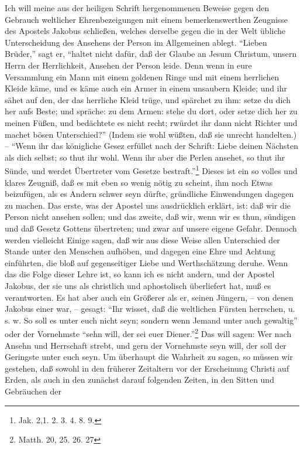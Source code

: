 Ich will meine aus der heiligen Schrift hergenommenen Beweise gegen den Gebrauch
weltlicher Ehrenbezeigungen mit einem bemerkenswerthen Zeugnisse des Apostels
Jakobus schließen, welches derselbe gegen die in der Welt übliche Unterscheidung
des Ansehens der Person im Allgemeinen ablegt. "`Lieben Brüder,"' sagt er,
"`haltet nicht dafür, daß der Glaube an Jesum Christum, unsern Herrn der
Herrlichkeit, Ansehen der Person leide. Denn wenn in eure Versammlung ein Mann
mit einem goldenen Ringe und mit einem herrlichen Kleide käme, und es käme auch
ein Armer in einem unsaubern Kleide; und ihr sähet auf den, der das herrliche
Kleid trüge, und spärchet zu ihm: setze du dich her aufs Beste; und spräche: zu
dem Armen: stehe du dort, oder setze dich her zu meinen Füßen, und bedächtete es
nicht recht; rwürdet ihr dann nicht Richter und machet bösen Unterschied?"'
(Indem sie wohl wüßten, daß sie unrecht handelten.) -- "`Wenn ihr das königliche
Gesez erfüllet nach der Schrift: Liebe deinen Nächsten als dich selbst; so thut
ihr wohl. Wenn ihr aber die Perlen ansehet, so thut ihr Sünde, und werdet
Übertreter vom Gesetze bestraft."'\footnote{Jak. 2,1. 2. 3. 4. 8. 9.} Dieses ist
ein so volles und klares Zeugniß, daß es mit eben so wenig nötig zu scheint, ihm
noch Etwas beizufügen, als es Andern schwer seyn dürfte, gründliche Einwendungen
dagegen zu machen. Das erste, was der Apostel uns ausdrücklich erklärt, ist: daß
wir die Person nicht ansehen sollen; und das zweite, daß wir, wenn wir es thun,
sündigen und daß Gesetz Gottens übertreten; und zwar auf unsere eigene Gefahr.
Dennoch werden vielleicht Einige sagen, daß wir aus diese Weise allen
Unterschied der Stande unter den Menschen aufhöben, und dagegen eine Ehre und
Achtung einführten, die bloß auf gegenseitiger Liebe und Werthschätzung deruhe.
Wenn das die Folge dieser Lehre ist, so kann ich es nicht andern, und der
Apostel Jakobus, der sie uns als christlich und aphostolisch überliefert hat,
muß es verantworten. Es hat aber auch ein Größerer als er, seinen Jüngern, --
von denen Jakobus einer war, -- gesagt: "`Ihr wisset, daß die weltlichen Fürsten
herrschen, u. s. w. So soll es unter euch nicht seyn; sondern wenn Jemand unter
auch gewaltig"' oder der Vornehmste "`sehn will, der sei euer
Diener."'\footnote{Matth. 20, 25. 26. 27} Das will sagen: Wer nach Ansehn und
Herrschaft strebt, und gern der Vornehmste seyn will, der soll der Geringste
unter euch seyn. Um überhaupt die Wahrheit zu sagen, so müssen wir gestehen, daß
sowohl in den früherer Zeitaltern vor der Erscheinung Christi auf Erden, als
auch in den zunächst darauf folgenden Zeiten, in den Sitten und Gebräuchen der
